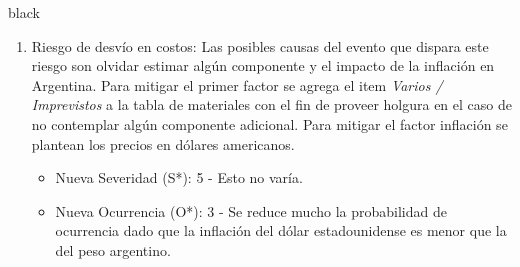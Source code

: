 \documentclass[
11pt, %
]{charter}
\begin{document}
\begin{consigna}{black}
\begin{enumerate}
	\item Riesgo de desvío en costos: Las posibles causas del evento que dispara este riesgo son olvidar estimar algún componente y el impacto de la inflación en Argentina. Para mitigar el primer factor se agrega el item \textit{Varios / Imprevistos} a la tabla de materiales con el fin de proveer holgura en el caso de no contemplar algún componente adicional. Para mitigar el factor inflación se plantean los precios en dólares americanos.
	\begin{itemize}
		\item Nueva Severidad (S*): 5 - Esto no varía.
		\item Nueva Ocurrencia (O*): 3 - Se reduce mucho la probabilidad de ocurrencia dado que la inflación del dólar estadounidense es menor que la del peso argentino.
	\end{itemize}
\end{enumerate}
\end{consigna}
\end{document}
